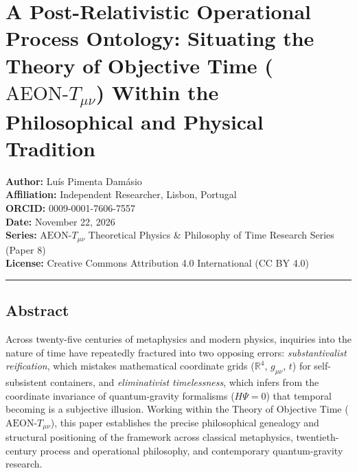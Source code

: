 \documentclass[
]{article}
\author{}
\date{}
\begin{document}
\section{\texorpdfstring{A Post-Relativistic Operational Process
Ontology: Situating the Theory of Objective Time
(\(\text{AEON-}T_{\mu\nu}\)) Within the Philosophical and Physical
Tradition}{A Post-Relativistic Operational Process Ontology: Situating the Theory of Objective Time (\textbackslash text\{AEON-\}T\_\{\textbackslash mu\textbackslash nu\}) Within the Philosophical and Physical Tradition}}\label{a-post-relativistic-operational-process-ontology-situating-the-theory-of-objective-time-textaeon-t_munu-within-the-philosophical-and-physical-tradition}

\textbf{Author:} Luís Pimenta Damásio\\
\textbf{Affiliation:} Independent Researcher, Lisbon, Portugal\\
\textbf{ORCID:} 0009-0001-7606-7557\\
\textbf{Date:} November 22, 2026\\
\textbf{Series:} \(\text{AEON-}T_{\mu\nu}\) Theoretical Physics \&
Philosophy of Time Research Series (Paper 8)\\
\textbf{License:} Creative Commons Attribution 4.0 International (CC BY
4.0)

\begin{center}\rule{0.5\linewidth}{0.5pt}\end{center}

\subsection{Abstract}\label{abstract}

Across twenty-five centuries of metaphysics and modern physics,
inquiries into the nature of time have repeatedly fractured into two
opposing errors: \emph{substantivalist reification}, which mistakes
mathematical coordinate grids (\(\mathbb{R}^4\), \(g_{\mu\nu}\), \(t\))
for self-subsistent containers, and \emph{eliminativist timelessness},
which infers from the coordinate invariance of quantum-gravity
formalisms (\(H\Psi = 0\)) that temporal becoming is a subjective
illusion. Working within the Theory of Objective Time
(\(\text{AEON-}T_{\mu\nu}\)), this paper establishes the precise
philosophical genealogy and structural positioning of the framework
across classical metaphysics, twentieth-century process and operational
philosophy, and contemporary quantum-gravity research.
\end{document}
